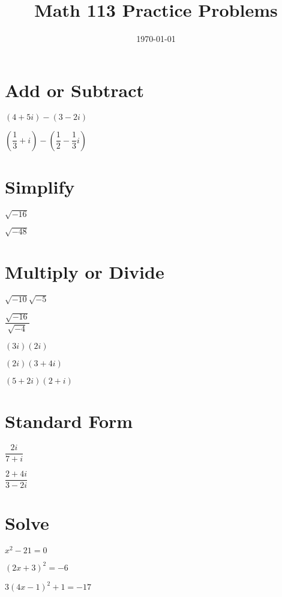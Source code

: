 \documentclass[fleqn,addpoints]{exam}
\title{Math 113 Practice Problems}
\author{}
\date{\today}
\begin{document}
\maketitle

\begin{questions}

\section{Add or Subtract}

\question \( (4 + 5i) - (3 - 2i) \) 
\vspace{1.5 cm}

\question \( (\dfrac{1}{3} + i) - (\dfrac{1}{2} - \dfrac{1}{3}i) \) 
\vspace{1.5 cm}

\section{Simplify}

\question \( \sqrt{-16} \) 
\vspace{1.5 cm}

\question \( \sqrt{-48} \) 
\vspace{1.5 cm}

\section{Multiply or Divide}

\question \( \sqrt{-10} \sqrt{-5} \) 
\vspace{1.5 cm}

\question \( \dfrac{\sqrt{-16}}{\sqrt{-4}} \) 
\vspace{1.5 cm}

\question \( (3i) (2i) \) 
\vspace{1.5 cm}

\question \( (2i) (3 + 4i) \) 
\vspace{1.5 cm}

\question \( (5 + 2i) (2 + i) \) 
\vspace{1.5 cm}

\section{Standard Form}

\question \( \dfrac{2i}{7 + i} \) 
\vspace{1.5 cm}

\question \( \dfrac{2 + 4i}{3 - 2i} \) 
\vspace{1.5 cm}


\section{Solve}

\question \( x^2 - 21 = 0 \) 
\vspace{2 cm}

\question \( (2x + 3)^2 = -6 \) 
\vspace{2 cm}

\question \( 3(4x-1)^2 + 1 = -17 \) 
\vspace{2 cm}


\end{questions}
\end{document}
